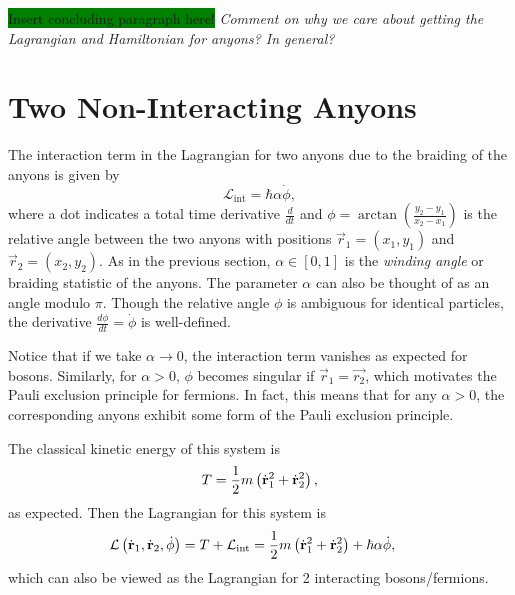 \colorbox{green}{Insert concluding paragraph here!}
\textit{Comment on why we care about getting the Lagrangian and Hamiltonian for anyons? In general?}

\section{Two Non-Interacting Anyons}\label{sec:non_int}

The interaction term in the Lagrangian for two anyons due to the braiding of the anyons is given by
\begin{equation}
    \mathcal{L}_{\text{int}} = \hbar\alpha\dot{\phi},
\end{equation}
where a dot indicates a total time derivative $\frac{d}{dt}$ and $\phi = \arctan\left( \frac{y_2-y_1}{x_2-x_1} \right)$ is the relative angle between the two anyons with positions $\vec{r}_1=(x_1,y_1)$ and $\vec{r}_2=(x_2,y_2)$. As in the previous section, $\alpha\in\left[ 0,1 \right]$ is the \textit{winding angle} or braiding statistic of the anyons. The parameter $\alpha$ can also be thought of as an angle modulo $\pi$. Though the relative angle $\phi$ is ambiguous for identical particles, the derivative $\frac{d\phi}{dt}=\dot{\phi}$ is well-defined.

Notice that if we take $\alpha\to 0$, the interaction term vanishes as expected for bosons. Similarly, for $\alpha>0$, $\phi$ becomes singular if $\vec{r}_1 = \vec{r_2}$, which motivates the Pauli exclusion principle for fermions. In fact, this means that for any $\alpha>0$, the corresponding anyons exhibit some form of the Pauli exclusion principle.

The classical kinetic energy of this system is
\begin{equation}
    T = \frac{1}{2}m\left( {\dot{\mathbf{r}}_1}^2 + {\dot{\mathbf{r}}_2}^2 \right),
\end{equation}
as expected. Then the Lagrangian for this system is
\begin{align}
    \mathcal{L}\left( \dot{\mathbf{r}}_1,\dot{\mathbf{r}}_2, \dot{\phi} \right) &= T + \mathcal{L}_{\text{int}} = \frac{1}{2}m\left( {\dot{\mathbf{r}}_1}^2 + {\dot{\mathbf{r}}_2}^2 \right) + \hbar\alpha\dot{\phi},
\end{align}
which can also be viewed as the Lagrangian for 2 interacting bosons/fermions.

